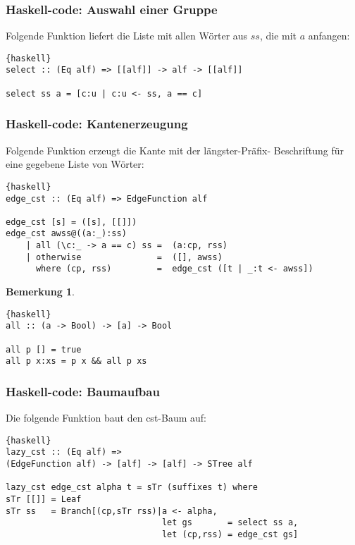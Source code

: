 \documentclass{beamer}
\newtheorem{remark}[theorem]{Bemerkung}
\begin{document}
\begin{frame}[fragile]
\frametitle{Haskell-code: Auswahl einer Gruppe}
    Folgende Funktion liefert die Liste mit allen Wörter aus $ss$, die mit $a$ anfangen:
\begin{lstlisting}{haskell}
select :: (Eq alf) => [[alf]] -> alf -> [[alf]]

select ss a = [c:u | c:u <- ss, a == c]
\end{lstlisting}
\bigskip
\end{frame}

\begin{frame}[fragile]
\frametitle{Haskell-code: Kantenerzeugung}
Folgende Funktion erzeugt die Kante mit der längster-Präfix- Beschriftung für eine gegebene Liste von Wörter:
\begin{lstlisting}{haskell}
edge_cst :: (Eq alf) => EdgeFunction alf

edge_cst [s] = ([s], [[]])
edge_cst awss@((a:_):ss) 
    | all (\c:_ -> a == c) ss =  (a:cp, rss)
    | otherwise               =  ([], awss)
      where (cp, rss)         =  edge_cst ([t | _:t <- awss])
\end{lstlisting}
\bigskip
\begin{remark}
\begin{lstlisting}{haskell}
all :: (a -> Bool) -> [a] -> Bool

all p [] = true
all p x:xs = p x && all p xs
\end{lstlisting}     
\end{remark}
\end{frame}

\begin{frame}[fragile]
\frametitle{Haskell-code: Baumaufbau}
Die folgende Funktion baut den cst-Baum auf:
\begin{lstlisting}{haskell}
lazy_cst :: (Eq alf) => 
(EdgeFunction alf) -> [alf] -> [alf] -> STree alf

lazy_cst edge_cst alpha t = sTr (suffixes t) where 
sTr [[]] = Leaf
sTr ss   = Branch[(cp,sTr rss)|a <- alpha,
                               let gs       = select ss a,
                               let (cp,rss) = edge_cst gs]
\end{lstlisting}
\end{frame}

\begin{frame}
\end{frame}
\end{document}

